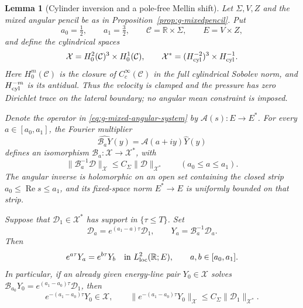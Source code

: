 \documentclass[11pt,a4paper]{article}
\newtheorem{lemma}[theorem]{Lemma}
\theoremstyle{remark}
\numberwithin{equation}{section}
\begin{document}
\begin{lemma}[Cylinder inversion and a pole-free Mellin shift]
\label{lem:g-mellin-inversion}
Let $\Sigma,V,Z$ and the mixed angular pencil be as in
Proposition~\ref{prop:g-mixedpencil}. Put
\[
 a_0=\tfrac12,\qquad a_1=\tfrac32,\qquad
 \mathcal C=\mathbb R\times\Sigma,\qquad E=V\times Z,
\]
and define the cylindrical spaces
\[
 \mathcal X=H^2_0(\mathcal C)^3\times H^1_0(\mathcal C),
 \qquad
 \mathcal X^*=(H^{-2}_{\rm cyl})^3\times H^{-1}_{\rm cyl}.
\]
Here $H^m_0(\mathcal C)$ is the closure of $C_c^\infty(\mathcal C)$
in the full cylindrical Sobolev norm, and $H^{-m}_{\rm cyl}$ is its
antidual. Thus the velocity is clamped and the pressure has zero
Dirichlet trace on the lateral boundary; no angular mean constraint is
imposed.

Denote the operator in \eqref{eq:g-mixed-angular-system} by
$\mathcal A(s):E\to E^*$. For every $a\in[a_0,a_1]$, the Fourier
multiplier
\[
 \widehat{\mathcal B_a Y}(y)=
 \mathcal A(a+iy)\widehat Y(y)
\]
defines an isomorphism $\mathcal B_a:\mathcal X\to\mathcal X^*$, with
\begin{equation}\label{eq:g-cylinder-line-inverse}
 \|\mathcal B_a^{-1}\mathcal D\|_{\mathcal X}
 \le C_\Sigma\|\mathcal D\|_{\mathcal X^*}
 \qquad(a_0\le a\le a_1).
\end{equation}
The angular inverse is holomorphic on an open set containing the closed
strip $a_0\le\operatorname{Re}s\le a_1$, and its fixed-space norm
$E^*\to E$ is uniformly bounded on that strip.

Suppose that $\mathcal D_1\in\mathcal X^*$ has support in
$\{\tau\le T\}$. Set
\[
 \mathcal D_a=e^{(a_1-a)\tau}\mathcal D_1,\qquad
 Y_a=\mathcal B_a^{-1}\mathcal D_a.
\]
Then
\begin{equation}\label{eq:g-mellin-line-identification}
 e^{a\tau}Y_a=e^{b\tau}Y_b
 \quad\hbox{in }L^2_{\rm loc}(\mathbb R;E),
 \qquad a,b\in[a_0,a_1].
\end{equation}
In particular, if an already given energy-line pair $Y_0\in\mathcal X$
solves
$\mathcal B_{a_0}Y_0=e^{(a_1-a_0)\tau}\mathcal D_1$, then
\[
 e^{-(a_1-a_0)\tau}Y_0\in\mathcal X,\qquad
 \|e^{-(a_1-a_0)\tau}Y_0\|_{\mathcal X}
 \le C_\Sigma\|\mathcal D_1\|_{\mathcal X^*}.
\]
\end{lemma}
\end{document}
